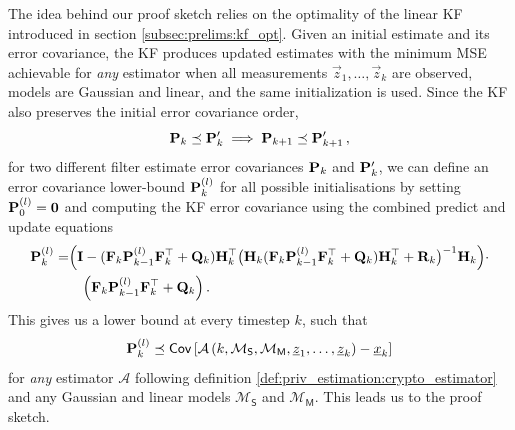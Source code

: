 The idea behind our proof sketch relies on the optimality of the linear KF introduced in section \ref{subsec:prelims:kf_opt}. Given an initial estimate and its error covariance, the KF produces updated estimates with the minimum MSE achievable for \textit{any} estimator when all measurements $\vec{z}_1,\dots,\vec{z}_k$ are observed, models are Gaussian and linear, and the same initialization is used. Since the KF also preserves the initial error covariance order,
\begin{equation}
   {\ensuremath{{\mathbf{P}}}}_k \preceq {\ensuremath{{\mathbf{P}}}}_k^\prime \implies {\ensuremath{{\mathbf{P}}}}_{k+1} \preceq {\ensuremath{{\mathbf{P}}}}_{k+1}^\prime\,,
\end{equation}
for two different filter estimate error covariances ${{\mathbf{P}}}_k$ and ${{\mathbf{P}}}_k^\prime$, we can define an error covariance lower-bound ${{\mathbf{P}}}_k^{(l)}$ for all possible initialisations by setting ${{\mathbf{P}}}_0^{(l)} = {{\mathbf{0}}}$ and computing the KF error covariance using the combined predict and update equations
\begin{equation}\label{eq:priv_estimation:est_lower_bound_error_cov}
    \begin{split}
        {\ensuremath{{\mathbf{P}}}}_k^{(l)} =& \Bigl( {{\mathbf{I}}} - ({{\mathbf{F}}}_k{{\mathbf{P}}}_{k-1}^{(l)}{{\mathbf{F}}}_k^\top + {{\mathbf{Q}}}_k){{\mathbf{H}}}_k^\top \bigl({{\mathbf{H}}}_k({{\mathbf{F}}}_k{{\mathbf{P}}}_{k-1}^{(l)}{{\mathbf{F}}}_k^\top + {{\mathbf{Q}}}_k){{\mathbf{H}}}_k^\top + {{\mathbf{R}}}_k\bigr)^{-1}{{\mathbf{H}}}_k\Bigr)\cdot\\
        &\quad\Bigl({{\mathbf{F}}}_k{{\mathbf{P}}}_{k-1}^{(l)}{{\mathbf{F}}}_k^\top + {{\mathbf{Q}}}_k\Bigr)\,.
    \end{split}
\end{equation}
This gives us a lower bound at every timestep $k$, such that
\begin{equation}
    {\ensuremath{{\mathbf{P}}}}_k^{(l)} \preceq \mathsf{Cov}\left[\mathcal{A}\left(k, \mathcal{M}_{\mathsf{S}}, \mathcal{M}_{\mathsf{M}}, {\underline{z}}_1,\dots,{\underline{z}}_k\right) - {\underline{x}}_k \right]
\end{equation}
for \textit{any} estimator $\mathcal{A}$ following definition \ref{def:priv_estimation:crypto_estimator} and any Gaussian and linear models $\mathcal{M}_{\mathsf{S}}$ and $\mathcal{M}_{\mathsf{M}}$. This leads us to the proof sketch.

% 
% 

